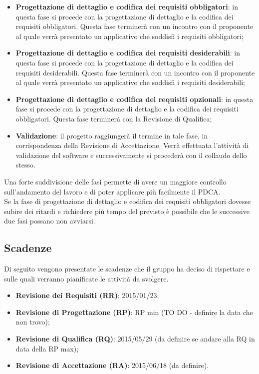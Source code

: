 \begin{itemize}
			\item \textbf{Progettazione di dettaglio e codifica dei requisiti obbligatori}: in questa fase si procede con la progettazione di dettaglio e la codifica dei requisiti obbligatori. Questa fase terminerà con un incontro con il proponente al quale verrà presentato un applicativo che soddisfi i requisiti obbligatori;
			
			\item \textbf{Progettazione di dettaglio e codifica dei requisiti desiderabili}: in questa fase si procede con la progettazione di dettaglio e la codifica dei requisiti desiderabili. Questa fase terminerà con un incontro con il proponente al quale verrà presentato un applicativo che soddisfi i requisiti desiderabili;
			
			\item \textbf{Progettazione di dettaglio e codifica dei requisiti opzionali}: in questa fase si procede con la progettazione di dettaglio e la codifica dei requisiti obbligatori. Questa fase terminerà con la Revisione di Qualifica;
			
			\item \textbf{Validazione}: il progetto raggiungerà il termine in tale fase, in corrispondenza della Revisione di Accettazione. Verrà effettuata l’attività di validazione del software e successivamente si procederà con il collaudo dello stesso.
		\end{itemize}
\noindent
	Una forte suddivisione delle fasi permette di avere un maggiore controllo sull'andamento del lavoro e di poter applicare più facilmente il PDCA. \\
	Se la fase di progettazione di dettaglio e codifica dei requisiti obbligatori dovesse subire dei ritardi e richiedere più tempo del previsto è possibile che le successive due fasi possano non avviarsi.

	\subsection{Scadenze}
	Di seguito vengono presentate le scadenze che il gruppo \groupName{} ha deciso di rispettare e sulle quali verranno pianificate le attività da svolgere.
		\begin{itemize}
			\item \textbf{Revisione dei Requisiti (RR)}: 2015/01/23;
			\item \textbf{Revisione di Progettazione (RP)}: RP min (TO DO - definire la data che non trovo);
			\item \textbf{Revisione di Qualifica (RQ)}: 2015/05/29 (da definire se andare alla RQ in data della RP max);
			\item \textbf{Revisione di Accettazione (RA)}: 2015/06/18 (da definire).
		\end{itemize}